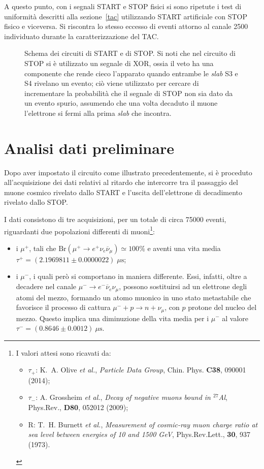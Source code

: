 \documentclass[10pt, oneside, a4paper]{article}   	%
\begin{document}
A questo punto, con i segnali START e STOP fisici si sono ripetute i test di uniformità descritti alla sezione~\ref{tac} utilizzando START artificiale con STOP fisico e viceversa. Si riscontra lo stesso eccesso di eventi attorno al canale 2500 individuato durante la caratterizzazione del TAC.
%
\begin{figure}[h]
	\centering
	
	\caption{Schema dei circuiti di START e di STOP. Si noti che nel circuito di STOP si è utilizzato un segnale di XOR, ossia il veto ha una componente che rende cieco l'apparato quando entrambe le \emph{slab} S3 e S4 rivelano un evento; ciò viene utilizzato per cercare di incrementare la probabilità che il segnale di STOP non sia dato da un evento spurio, assumendo che una volta decaduto il muone l'elettrone si fermi alla prima \emph{slab} che incontra.}
	\label{scemi}
\end{figure}
%
\section{Analisi dati preliminare}
\label{analPrelim}
Dopo aver impostato il circuito come illustrato precedentemente, si è proceduto all'acquisizione dei dati relativi al ritardo che intercorre tra il passaggio del muone cosmico rivelato dallo START e l'uscita dell'elettrone di decadimento rivelato dallo STOP.

I dati consistono di tre acquisizioni, per un totale di circa 75000 eventi, riguardanti due popolazioni differenti di muoni\footnote{I valori attesi sono ricavati da: 
\begin{itemize}
\item $\tau_{+}$:  K.~A. Olive \emph{et al.}, \emph{Particle Data Group}, Chin. Phys. \textbf{C38}, 090001 (2014);
\item $\tau_{-}$: A. Grossheim \emph{et al.}, \emph{Decay of negative muons bound in $^{27}$Al}, Phys.Rev., \textbf{D80}, 052012 (2009); 
\item R: T.~H. Burnett \emph{et al.}, \emph{Measurement of cosmic-ray muon charge ratio at sea level between energies of 10 and 1500 GeV}, Phys.Rev.Lett., \textbf{30}, 937 (1973).
\end{itemize}}:
\begin{itemize}
	\item i $\mu^+$, tali che $\mbox{Br}(\mu^+ \to e^+\nu_e\overline{\nu}_\mu)\simeq 100 \%$ e aventi una vita media \linebreak $\tau^+=(2.1969811 \pm 0.0000022)\;\mu\mbox{s}$;
\item i $\mu^-$, i quali però si comportano in maniera differente. Essi, infatti, oltre a decadere nel canale $\mu^-\to e^-\overline{\nu}_e\nu_\mu$, possono sostituirsi ad un elettrone degli atomi del mezzo, formando un atomo muonico in uno stato metastabile che favorisce il processo di cattura $\mu^-+p\to n+\nu_\mu $, con $p$ protone del nucleo del mezzo. Questo implica una diminuzione della vita media per i $\mu^-$ al valore $\tau^-=(0.8646 \pm 0.0012) \ \mu \mbox{s}$.
\end{itemize}
\end{document}
